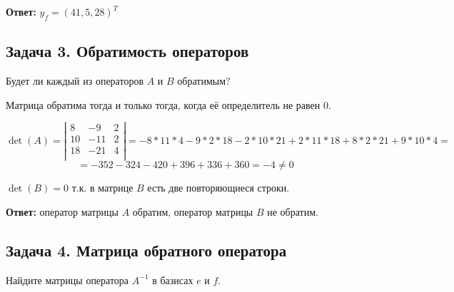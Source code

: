\documentclass[12pt]{article}
\begin{document}
\textbf{Ответ:} $y_f = (41, 5, 28)^T$

\subsection*{Задача 3. Обратимость операторов}
Будет ли каждый из операторов $ A $ и $ B $ обратимым?

Матрица обратима тогда и только тогда, когда её определитель не равен 0.

$$
	\det(A) =
	\left|
	\begin{matrix}
		8  & -9  & 2 \\
		10 & -11 & 2 \\
		18 & -21 & 4 \\
	\end{matrix}
	\right|
	= -8 * 11 * 4
	- 9 * 2 * 18
	- 2 * 10 * 21
	+ 2 * 11 * 18
	+ 8 * 2 * 21
	+ 9 * 10 * 4
	=
$$
$$
	= - 352 - 324 - 420 + 396 + 336 + 360 = -4 \neq 0
$$

$\det(B) = 0$ т.к. в матрице $B$ есть две повторяющиеся строки.

\textbf{Ответ:} оператор матрицы $A$ обратим, оператор матрицы $B$ не обратим.

\subsection*{Задача 4. Матрица обратного оператора}
Найдите матрицы оператора $ A^{-1} $ в базисах $ e $ и $ f $.
\end{document}
